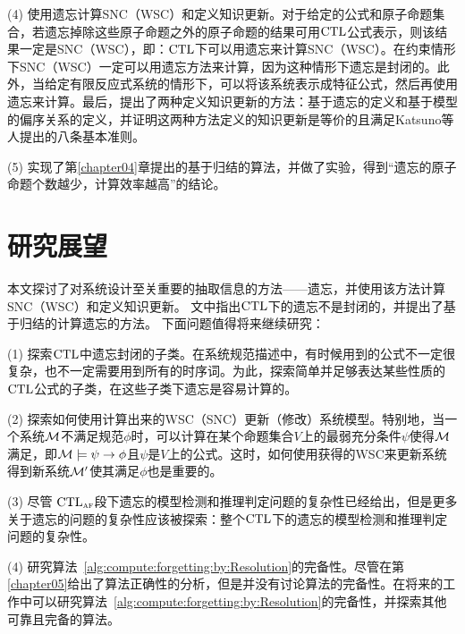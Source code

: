(4) 使用遗忘计算SNC（WSC）和定义知识更新。对于给定的公式和原子命题集合，若遗忘掉除这些原子命题之外的原子命题的结果可用$\textrm{CTL}$公式表示，则该结果一定是SNC（WSC），即：$\textrm{CTL}$下可以用遗忘来计算SNC（WSC）。在约束情形下SNC（WSC）一定可以用遗忘方法来计算，因为这种情形下遗忘是封闭的。此外，当给定有限反应式系统的情形下，可以将该系统表示成特征公式，然后再使用遗忘来计算。最后，提出了两种定义知识更新的方法：基于遗忘的定义和基于模型的偏序关系的定义，并证明这两种方法定义的知识更新是等价的且满足Katsuno等人提出的八条基本准则。

(5) 实现了第\ref{chapter04}章提出的基于归结的算法，并做了实验，得到“遗忘的原子命题个数越少，计算效率越高”的结论。



\section{研究展望}
本文探讨了对系统设计至关重要的抽取信息的方法——遗忘，并使用该方法计算SNC（WSC）和定义知识更新。
文中指出$\textrm{CTL}$下的遗忘不是封闭的，并提出了基于归结的计算遗忘的方法。
下面问题值得将来继续研究：

(1) 探索$\textrm{CTL}$中遗忘封闭的子类。在系统规范描述中，有时候用到的公式不一定很复杂，也不一定需要用到所有的时序词。为此，探索简单并足够表达某些性质的$\textrm{CTL}$公式的子类，在这些子类下遗忘是容易计算的。

(2) 探索如何使用计算出来的WSC（SNC）更新（修改）系统模型。特别地，当一个系统$\cal M$不满足规范$\phi$时，可以计算在某个命题集合$V$上的最弱充分条件$\psi$使得${\cal M}$满足，即${\cal M}\models\psi\rightarrow \phi$且$\psi$是$V$上的公式。这时，如何使用获得的WSC来更新系统得到新系统${\cal M}'$使其满足$\phi$也是重要的。


(3) 尽管 $\textrm{CTL}_{\textsc{a}\textsc{f}}$段下遗忘的模型检测和推理判定问题的复杂性已经给出，但是更多关于遗忘的问题的复杂性应该被探索：整个$\textrm{CTL}$下的遗忘的模型检测和推理判定问题的复杂性。

(4) 研究算法~\ref{alg:compute:forgetting:by:Resolution}的完备性。尽管在第\ref{chapter05}给出了算法正确性的分析，但是并没有讨论算法的完备性。在将来的工作中可以研究算法~\ref{alg:compute:forgetting:by:Resolution}的完备性，并探索其他可靠且完备的算法。

